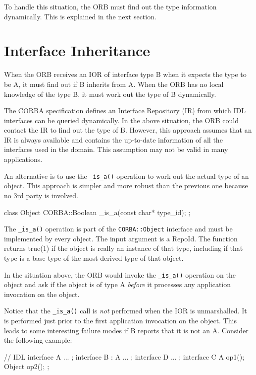 \documentclass[11pt,twoside,a4paper]{book}
\newcommand{\intf}[1]{\texttt{#1}}
\newcommand{\op}[1]{\texttt{#1()}}
\begin{document}
To handle this situation, the ORB must find out the type information
dynamically. This is explained in the next section.

\section{Interface Inheritance}

When the ORB receives an IOR of interface type B when it expects the
type to be A, it must find out if B inherits from A. When the ORB has
no local knowledge of the type B, it must work out the type of B
dynamically.

The CORBA specification defines an Interface Repository (IR) from
which IDL interfaces can be queried dynamically. In the above
situation, the ORB could contact the IR to find out the type of B.
However, this approach assumes that an IR is always available and
contains the up-to-date information of all the interfaces used in the
domain. This assumption may not be valid in many applications.

An alternative is to use the \op{\_is\_a} operation to work out the
actual type of an object. This approach is simpler and more robust
than the previous one because no 3rd party is involved.

\begin{cxxlisting}
class Object{
    CORBA::Boolean _is_a(const char* type_id);
};
\end{cxxlisting}

The \op{\_is\_a} operation is part of the \intf{CORBA::Object}
interface and must be implemented by every object. The input argument
is a RepoId. The function returns true(1) if the object is really an
instance of that type, including if that type is a base type of the
most derived type of that object.

In the situation above, the ORB would invoke the \op{\_is\_a}
operation on the object and ask if the object is of type A
\emph{before} it processes any application invocation on the object.

Notice that the \op{\_is\_a} call is \emph{not} performed when the IOR
is unmarshalled. It is performed just prior to the first application
invocation on the object. This leads to some interesting failure modes
if B reports that it is not an A. Consider the following example:

\begin{idllisting}
// IDL
interface A { ... };
interface B : A { ... };
interface D { ... };
interface C {
  A      op1();
  Object op2();
};
\end{idllisting}
\end{document}
